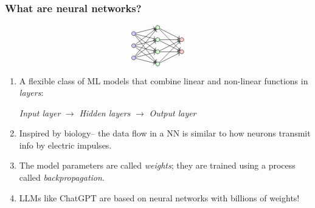 \documentclass{beamer}
\theoremstyle{definition}
\begin{document}
\frame%
{\frametitle{What are neural networks?}
\begin{equation*}
\begin{tikzpicture}[scale=0.5, transform shape]
    \foreach \i in {1,...,3}
        \node[circle, draw, fill=blue!20] (I\i) at (0,-\i) {};

    \foreach \i in {1,...,4}
        \node[circle, draw, fill=green!20] (H\i) at (2,-\i+0.5) {};

    \foreach \i in {1,...,2}
        \node[circle, draw, fill=red!20] (O\i) at (4,-\i-0.5) {};

    \foreach \i in {1,...,3}
        \foreach \j in {1,...,4}
            \draw[->] (I\i) -- (H\j);

    \foreach \i in {1,...,4}
        \foreach \j in {1,...,2}
            \draw[->] (H\i) -- (O\j);
\end{tikzpicture}
\end{equation*}
\begin{enumerate}[$\bullet$]
    \item A flexible class of ML models that combine linear and non-linear functions in \emph{layers}:
    \begin{center}
    {\color{blue} \emph{Input layer}} $\longrightarrow$ {\color{darkgreen} \emph{Hidden layers}} $\longrightarrow$ {\color{red} \emph{Output layer}}
    \end{center} \vspace{0.05in}\pause
    \item Inspired by biology-- the data flow in a NN is similar to how neurons transmit info by electric impulses. \vspace{0.05in}\pause
    \item The model parameters are called \emph{weights}; they are trained using a process called \emph{backpropagation}. \vspace{0.05in} \pause
    \item LLMs like ChatGPT are based on neural networks with billions of weights! \vspace{0.05in} 
\end{enumerate}
}
\end{document}
